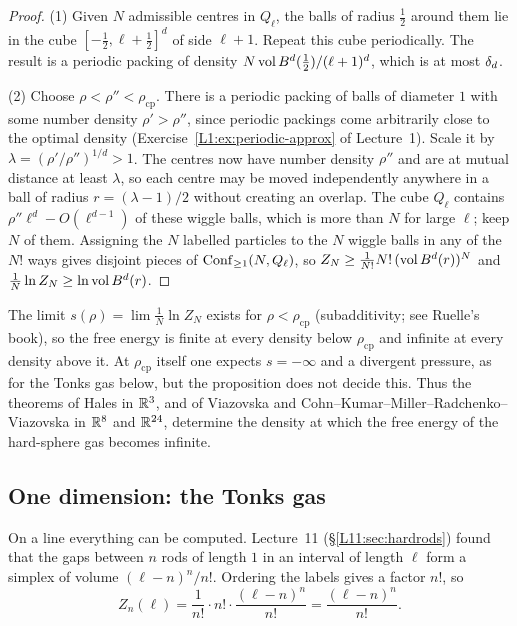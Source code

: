 \begin{proof}
(1) Given $N$ admissible centres in $Q_\ell$, the balls of radius $\frac12$ around them lie in the
cube $[-\frac12,\ell+\frac12]^d$ of side $\ell+1$. Repeat this cube periodically. The result is a
periodic packing of density $N\operatorname{vol}B^d(\frac12)/(\ell+1)^d$, which is at most $\delta_d$.

(2) Choose $\rho<\rho''<\rho_{\mathrm{cp}}$. There is a periodic packing of balls of diameter $1$
with some number density $\rho'>\rho''$, since periodic packings come arbitrarily close to the optimal density
(Exercise~\ref{L1:ex:periodic-approx} of Lecture~1). Scale it by $\lambda=(\rho'/\rho'')^{1/d}>1$. The
centres now have number density $\rho''$ and are at mutual distance at least $\lambda$, so each centre may
be moved independently anywhere in a ball of radius $r=(\lambda-1)/2$ without creating an overlap.
The cube $Q_\ell$ contains $\rho''\ell^d-O(\ell^{d-1})$ of these wiggle balls, which is more than $N$ for
large $\ell$; keep $N$ of them. Assigning the $N$ labelled particles to the $N$ wiggle balls in any of
the $N!$ ways gives disjoint pieces of $\operatorname{Conf}_{\ge1}(N,Q_\ell)$, so
$Z_N\ge\frac1{N!}N!\,(\operatorname{vol}B^d(r))^N$ and $\frac1N\ln Z_N\ge\ln\operatorname{vol}B^d(r)$.
\end{proof}

The limit $s(\rho)=\lim\frac1N\ln Z_N$ exists for $\rho<\rho_{\mathrm{cp}}$ (subadditivity; see Ruelle's
book), so the free energy is finite at every density below $\rho_{\mathrm{cp}}$ and infinite at every
density above it. At $\rho_{\mathrm{cp}}$ itself one expects $s=-\infty$ and a divergent pressure, as for the
Tonks gas below, but the proposition does not decide this. Thus the theorems of Hales in $\mathbb{R}^3$, and of Viazovska and
Cohn--Kumar--Miller--Radchenko--Viazovska in $\mathbb{R}^8$ and $\mathbb{R}^{24}$, determine the density at which the
free energy of the hard-sphere gas becomes infinite.

\subsection*{One dimension: the Tonks gas}

On a line everything can be computed. Lecture~11 (\S\ref{L11:sec:hardrods}) found that the gaps
between $n$ rods of length $1$ in an interval of length $\ell$ form a simplex of volume
$(\ell-n)^n/n!$. Ordering the labels gives a factor $n!$, so
\[
  Z_n(\ell)=\frac{1}{n!}\cdot n!\cdot\frac{(\ell-n)^n}{n!}=\frac{(\ell-n)^n}{n!}.
\]

